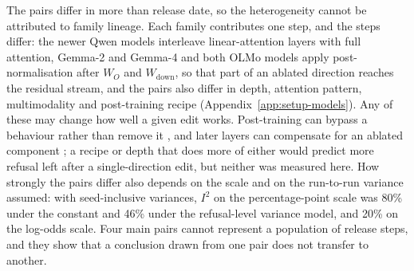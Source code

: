 The pairs differ in more than release date, so the heterogeneity cannot be
attributed to family lineage. Each family contributes one step, and the steps
differ: the newer Qwen models interleave linear-attention layers with full
attention, Gemma-2 and Gemma-4 and both OLMo models apply post-normalisation
after $W_O$ and $W_{\mathrm{down}}$, so that part of an ablated direction
reaches the residual stream, and the pairs also differ in depth, attention
pattern, multimodality and post-training recipe
(Appendix~\ref{app:setup-models}). Any of these may change how well a given
edit works. Post-training can bypass a behaviour rather than remove it
\cite{lee2024mechanistic,jain2024makes}, and later layers can compensate for an
ablated component \cite{mcgrath2023hydra}; a recipe or depth that does more of
either would predict more refusal left after a single-direction edit, but
neither was measured here. How strongly the pairs differ also depends on the
scale and on the run-to-run variance assumed: with seed-inclusive variances,
$I^2$ on the percentage-point scale was 80\% under the constant and 46\% under
the refusal-level variance model, and 20\% on the log-odds scale. Four main pairs
cannot represent a population of release steps, and they show that a
conclusion drawn from one pair does not transfer to another.

